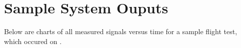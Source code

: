 \chapter{Sample System Ouputs}
Below are charts of all measured signals versus time for a sample flight test, which occured on . %